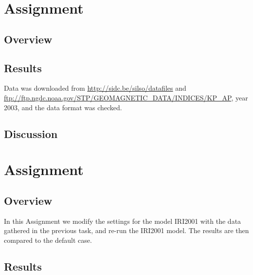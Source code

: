 \section{Assignment}
\subsection{Overview}

\subsection{Results}

Data was downloaded from \url{http://sidc.be/silso/datafiles} and \url{ftp://ftp.ngdc.noaa.gov/STP/GEOMAGNETIC_DATA/INDICES/KP_AP}, year 2003, and the data format was checked.
\subsection{Discussion}




\section{Assignment}
\subsection{Overview}
In this Assignment we modify the settings for the model IRI2001 with the data gathered in the previous task, and re-run the IRI2001 model.
The results are then compared to the default case.
\subsection{Results}


